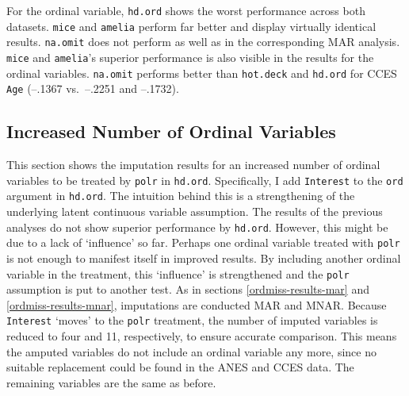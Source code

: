 \documentclass[12pt,econ]{sources/authesis}
\begin{document}
\normalsize

For the ordinal variable, \texttt{hd.ord} shows the worst performance across both datasets. \texttt{mice} and \texttt{amelia} perform far better and display virtually identical results. \texttt{na.omit} does not perform as well as in the corresponding MAR analysis. \texttt{mice} and \texttt{amelia}'s superior performance is also visible in the results for the ordinal variables. \texttt{na.omit} performs better than \texttt{hot.deck} and \texttt{hd.ord} for CCES \texttt{Age} (--.1367 vs.~--.2251 and --.1732).

\hypertarget{ordmiss-results-increaseOrd}{%
\subsection{Increased Number of Ordinal Variables}\label{ordmiss-results-increaseOrd}}

This section shows the imputation results for an increased number of ordinal variables to be treated by \texttt{polr} in \texttt{hd.ord}. Specifically, I add \texttt{Interest} to the \texttt{ord} argument in \texttt{hd.ord}. The intuition behind this is a strengthening of the underlying latent continuous variable assumption. The results of the previous analyses do not show superior performance by \texttt{hd.ord}. However, this might be due to a lack of `influence' so far. Perhaps one ordinal variable treated with \texttt{polr} is not enough to manifest itself in improved results. By including another ordinal variable in the treatment, this `influence' is strengthened and the \texttt{polr} assumption is put to another test. As in sections \ref{ordmiss-results-mar} and \ref{ordmiss-results-mnar}, imputations are conducted MAR and MNAR. Because \texttt{Interest} `moves' to the \texttt{polr} treatment, the number of imputed variables is reduced to four and 11, respectively, to ensure accurate comparison. This means the amputed variables do not include an ordinal variable any more, since no suitable replacement could be found in the ANES and CCES data. The remaining variables are the same as before.
\end{document}
